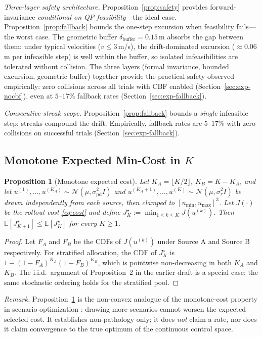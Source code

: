 \documentclass[11pt,onecolumn,a4paper]{article}
\newtheorem{proposition}{Proposition}
\newcommand{\E}{\mathbb{E}}
\newcommand{\pd}{\mathrm{pd}}
\begin{document}
\emph{Three-layer safety architecture.}
Proposition~\ref{prop:safety} provides forward-invariance
\emph{conditional on QP feasibility}---the ideal case.
Proposition~\ref{prop:fallback} bounds the one-step excursion when
feasibility fails---the worst case. The geometric buffer
$\delta_{\mathrm{buffer}} = 0.15\,$m absorbs the gap between them:
under typical velocities ($v \le 3\,$m/s), the drift-dominated
excursion (${\approx}0.06\,$m per infeasible step) is well within
the buffer, so isolated infeasibilities are tolerated without
collision. The three layers (formal invariance, bounded excursion,
geometric buffer) together provide the practical safety observed
empirically: zero collisions across all trials with CBF enabled
(Section~\ref{sec:exp-nocbf}), even at $5$--$17\%$ fallback rates
(Section~\ref{sec:exp-fallback}).

\emph{Consecutive-streak scope.}
Proposition~\ref{prop:fallback} bounds a \emph{single} infeasible
step; streaks compound the drift. Empirically, fallback rates are
$5$--$17\%$ with zero collisions on successful trials
(Section~\ref{sec:exp-fallback}).

\subsection{Monotone Expected Min-Cost in $K$}

\begin{proposition}[Monotone expected cost]\label{prop:mono}
Let $K_A = \lfloor K/2 \rfloor$, $K_B = K - K_A$, and let
$u^{(1)},\dots,u^{(K_A)} \sim \mathcal{N}(\mu, \sigma_\pd^2 I)$ and
$u^{(K_A+1)},\dots,u^{(K)} \sim \mathcal{N}(\mu, \sigma_r^2 I)$ be
drawn independently from each source, then clamped to
$[u_{\min}, u_{\max}]^3$. Let $J(\cdot)$ be the rollout cost
\eqref{eq:cost} and define
$J^\star_K := \min_{1 \le k \le K} J(u^{(k)})$. Then
$\E[J^\star_{K+1}] \le \E[J^\star_K]$ for every $K \ge 1$.
\end{proposition}
\begin{proof}
Let $F_A$ and $F_B$ be the CDFs of $J(u^{(k)})$ under Source A and
Source B respectively. For stratified allocation, the CDF of
$J^\star_K$ is $1 - (1 - F_A)^{K_A}(1 - F_B)^{K_B}$, which is
pointwise non-decreasing in both $K_A$ and $K_B$. The i.i.d.\
argument of Proposition~2 in the earlier draft is a special case;
the same stochastic ordering holds for the stratified pool.
\end{proof}

\emph{Remark.} Proposition~\ref{prop:mono} is the non-convex analogue
of the monotone-cost property in scenario optimization
\cite{CAM08,CAM18}: drawing more scenarios cannot worsen the
expected selected cost. It establishes non-pathology only; it does
\emph{not} claim a rate, nor does it claim convergence to the true
optimum of the continuous control space.
\end{document}
